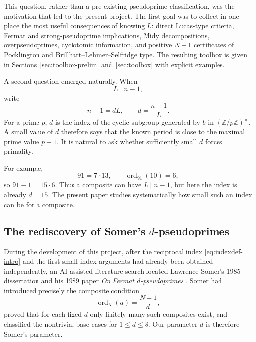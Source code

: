 \documentclass[11pt]{article}
\newcommand{\ord}{\operatorname{ord}}
\begin{document}
\begin{center}
\end{center}

This question, rather than a pre-existing pseudoprime classification, was the
motivation that led to the present project.  The first goal was to collect in
one place the most useful consequences of knowing $L$: direct Lucas-type
criteria, Fermat and strong-pseudoprime implications, Midy decompositions,
overpseudoprimes, cyclotomic information, and positive $N-1$ certificates of
Pocklington and Brillhart--Lehmer--Selfridge type.  The resulting toolbox is
given in Sections~\ref{sec:toolbox-prelim} and~\ref{sec:toolbox} with explicit
examples.

A second question emerged naturally.  When
\[
L\mid n-1,
\]
write
\begin{equation}
 n-1=dL,
 \qquad d=\frac{n-1}{L}.
 \label{eq:indexdef-intro}
\end{equation}
For a prime $p$, $d$ is the index of the cyclic subgroup generated by $b$ in
$(\mathbb Z/p\mathbb Z)^\times$.  A small value of $d$ therefore says that the
known period is close to the maximal prime value $p-1$.  It is natural to ask
whether sufficiently small $d$ forces primality.

For example,
\[
91=7\cdot13,\qquad \ord_{91}(10)=6,
\]
so $91-1=15\cdot6$.  Thus a composite can have $L\mid n-1$, but here the
index is already $d=15$.  The present paper studies systematically how small
such an index can be for a composite.

\subsection*{The rediscovery of Somer's $d$-pseudoprimes}

During the development of this project, after the reciprocal index
\eqref{eq:indexdef-intro} and the first small-index arguments had already been
obtained independently, an AI-assisted literature search located Lawrence
Somer's 1985 dissertation and his 1989 paper \emph{On Fermat
$d$-pseudoprimes} \cite{Somer1985,Somer1989}.  Somer had introduced precisely
the composite condition
\[
\ord_N(a)=\frac{N-1}{d},
\]
proved that for each fixed $d$ only finitely many such composites exist, and
classified the nontrivial-base cases for $1\le d\le8$.  Our parameter $d$
is therefore Somer's parameter.
\end{document}
